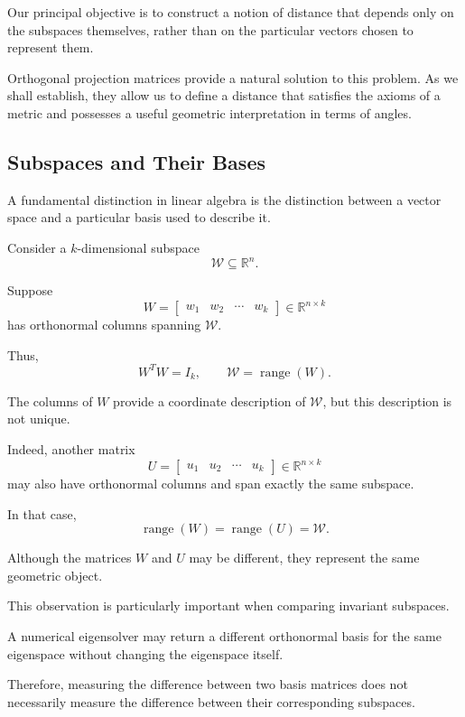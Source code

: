 \documentclass[14pt,letterpaper]{article}
\theoremstyle{plain}
\theoremstyle{definition}
\theoremstyle{remark}
\newcommand{\R}{\mathbb{R}}
\DeclareMathOperator{\range}{range}
\begin{document}
Our principal objective is to construct a notion
of distance that depends only on the subspaces
themselves, rather than on the particular vectors 
chosen to represent them.

Orthogonal projection matrices provide a natural
solution to this problem. As we shall establish,
they allow us to define a distance that satisfies
the axioms of a metric and possesses a useful
geometric interpretation in terms of angles.


\subsection{Subspaces and Their Bases}
\label{subsec:subspace_bases}

A fundamental distinction in linear algebra is
the distinction between a vector space and a
particular basis used to describe it.

Consider a $k$-dimensional subspace
\[
\mathcal W\subseteq\R^n.
\]

Suppose
\[
W=
\begin{bmatrix}
w_1 & w_2 & \cdots & w_k
\end{bmatrix}
\in\R^{n\times k}
\]
has orthonormal columns spanning $\mathcal W$.

Thus,
\[
W^TW=I_k,
\qquad
\mathcal W=\range(W).
\]

The columns of $W$ provide a coordinate
description of $\mathcal W$, but this
description is not unique.

Indeed, another matrix
\[
U=
\begin{bmatrix}
u_1 & u_2 & \cdots & u_k
\end{bmatrix}
\in\R^{n\times k}
\]
may also have orthonormal columns and span
exactly the same subspace.

In that case,
\[
\range(W)=\range(U)=\mathcal W.
\]

Although the matrices $W$ and $U$ may
be different, they represent the same
geometric object.

This observation is particularly important
when comparing invariant subspaces.

A numerical eigensolver may return a
different orthonormal basis for the same
eigenspace without changing the eigenspace
itself.

Therefore, measuring the difference
between two basis matrices does not
necessarily measure the difference
between their corresponding subspaces.
\end{document}
